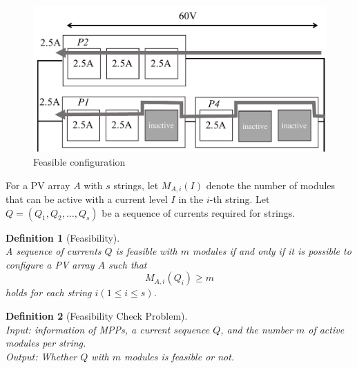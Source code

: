 \documentclass[conference]{IEEEtran}
\newtheorem{definition}{Definition}
\begin{document}
\begin{figure}[t]
    \centering
    \includegraphics[width=0.8\linewidth]{fig/feasible-configuration.pdf}
    \caption{Feasible configuration}
    \label{fig:feasible-configuration}
\end{figure}

For a PV array $A$ with $s$ strings, let $M_{A,i}(I)$ denote the number of modules that can be active with a current level $I$ in the $i$-th string.
Let $Q = (Q_{1},Q_{2},\ldots ,Q_{s})$ be a sequence of currents required for strings. 

\begin{definition}[Feasibility]\\
A sequence of currents $Q$ is feasible with $m$ modules if and only if it is possible to configure a PV array $A$ such that 
\begin{equation}
M_{A,i}(Q_{i}) \geq m
\end{equation}
holds for each string $i (1 \leq i \leq s)$.
\end{definition}


\begin{definition}[Feasibility Check Problem]\\
Input: information of MPPs, a current sequence $Q$, and the number $m$ of active modules per string.\\
Output: Whether $Q$ with $m$ modules is feasible or not.
\end{definition}
\end{document}
